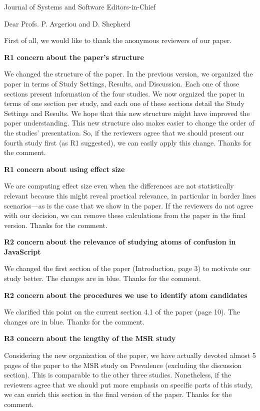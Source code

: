 \documentclass{letter}
\begin{document}
\begin{letter}{Journal of Systems and Software Editors-in-Chief}
  
\opening{Dear Profs. P. Avgeriou and D. Shepherd} 

First of all, we would like to thank the anonymous reviewers of
our paper.

{\bf R1 concern about the paper's structure}

We changed the structure of the paper. In the previous version,
we organized the paper in terms of Study Settings, Results, and Discussion.
Each one of those sections present information of the four studies.
We now orgnized the paper in terms of one section per study, and each
one of these sections detail the Study Settings and Results. We
hope that this new structure might have improved the paper understanding.
This new structure also makes easier to change the order of the
studies' presentation. So, if the reviewers agree that we should
present our fourth study first (as R1 suggested), we can easily
apply this change. Thanks for the comment. 

{\bf R1 concern about using effect size}

We are computing effect size even when the differences are
not statistically relevant because this might reveal practical
relevance, in particular in border lines scenarios---as is the case
that we show in the paper. If the reviewers do not agree with our
decision, we can remove these calculations from the paper in the
final version. Thanks for the comment. 

{\bf R2 concern about the relevance of studying atoms of confusion in JavaScript}

We changed the first section of the paper (Introduction, page 3) to motivate our study better. The
changes are in {\color{blue}blue}. Thanks for the comment. 

{\bf R2 concern about the procedures we use to identify atom candidates}

We clarified this point on the current section 4.1 of the paper (page 10). The changes are in
{\color{blue}blue}. Thanks for the comment.


{\bf R3 concern about the lengthy of the MSR study}

Considering the new organization of the paper, we have actually devoted almost 5 pages
of the paper to the MSR study on Prevalence (excluding the discussion section). This is comparable to the
other three studies. Nonetheless, if the reviewers agree that we should put more emphasis
on specific parts of this study, we can enrich this section in the final
version of the paper. Thanks for the comment. 


\end{letter}
\end{document}
